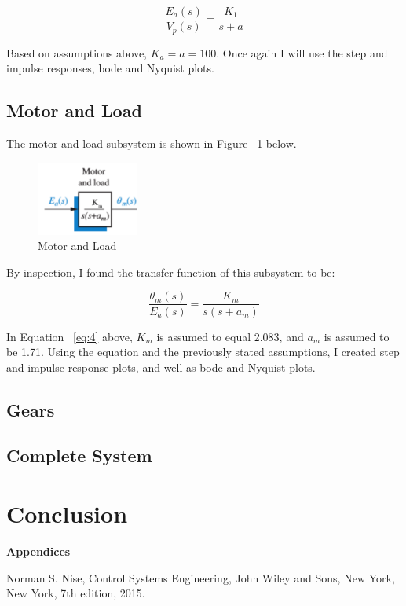 \documentclass[12pt]{article}
\begin{document}
\begin{equation}
\frac{E_{a}(s)}{V_{p}(s)} = \frac{K_{1}}{s+a}\label{eq:3}
\end{equation}

Based on assumptions above, $K_{a} = a = 100$. Once again I will use the step and impulse responses, bode and Nyquist plots.


\subsection{Motor and Load}

The motor and load subsystem is shown in Figure ~\ref{fig:motor} below.

\begin{figure}[H]
\begin{center}
	\includegraphics[width=0.3\textwidth]{./img/MotorBlock.png}
	\caption{\label{fig:motor}Motor and Load}
\end{center}
\end{figure}

By inspection, I found the transfer function of this subsystem to be:

\begin{equation}
\frac{\theta_{m}(s)}{E_{a}(s)} = \frac{K_{m}}{s(s+a_{m})}\label{eq:4}
\end{equation}

In Equation ~\ref{eq:4} above, $K_{m}$ is assumed to equal 2.083, and $a_{m}$ is assumed to be 1.71. Using the equation and the previously stated assumptions, I created step and impulse response plots, and well as bode and Nyquist plots.


\subsection{Gears}

\subsection{Complete System}

\section{Conclusion}

\pagebreak

\textbf{Appendices}

\begin{appendices}


\end{appendices}

\begin{thebibliography}{9}

  Norman S. Nise,
  Control Systems Engineering,
  John Wiley and Sons, New York, New York,
  7th edition,
  2015.

\end{thebibliography}
\end{document}
